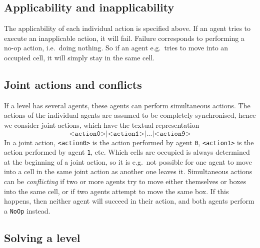 \documentclass[12pt,a4paper]{article}
\begin{document}
\subsection{Applicability and inapplicability}
The applicability of each individual action is specified above. If an agent tries to execute an inapplicable action, it will fail. Failure corresponds to performing a no-op action, i.e.\ doing nothing. So if an agent e.g.\ tries to move into an occupied cell, it will simply stay in the same cell. 

\subsection{Joint actions and conflicts}
If a level has several agents, these agents can perform simultaneous actions. The actions of the individual agents are assumed to be completely synchronised, hence we consider joint actions, which have the textual representation
\[
  \texttt{<action0>|<action1>|...|<action9>}
\]
In a joint action, \texttt{<action0>} is the action performed by agent \texttt{0}, \texttt{<action1>} is the action performed by agent \texttt{1}, etc. Which cells are occupied is always determined at the beginning of a joint action, so it is e.g.\ not possible for one agent to move into a cell in the same joint action as another one leaves it. Simultaneous actions can be \emph{conflicting} if two or more agents try to move either themselves or boxes into the same cell, or if two agents attempt to move the same box. If this happens, then neither agent will succeed in their action, and both agents perform a \texttt{NoOp} instead.

\subsection{Solving a level}
\end{document}
